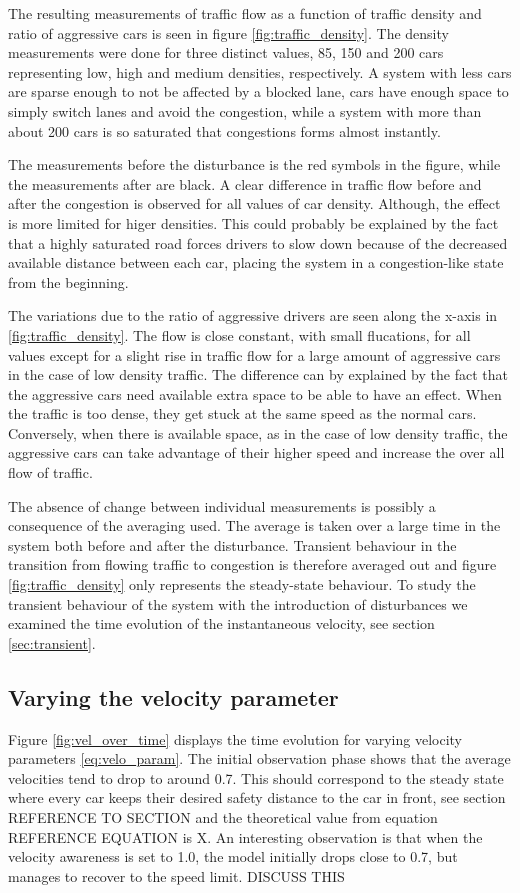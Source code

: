 \documentclass[11pt,a4paper,twocolumn]{article}
\begin{document}
 The resulting measurements of traffic flow as a function of traffic density and ratio of aggressive cars is seen in figure \ref{fig:traffic_density}. The density measurements were done for three distinct values, 85, 150 and 200 cars representing low, high and medium densities, respectively. A system with less cars are sparse enough to not be affected by a blocked lane, cars have enough space to simply switch lanes and avoid the congestion, while a system with more than about 200 cars is so saturated that congestions forms almost instantly.
 
 The measurements before the disturbance is the red symbols in the figure, while the measurements after are black. A clear difference in traffic flow before and after the congestion is observed for all values of car density. Although, the effect is more limited for higer densities. This could probably be explained by the fact that a highly saturated road forces drivers to slow down because of the decreased available distance between each car, placing the system in a congestion-like state from the beginning.

 The variations due to the ratio of aggressive drivers are seen along the x-axis in \ref{fig:traffic_density}. The flow is close constant, with small flucations, for all values except for a slight rise in traffic flow for a large amount of aggressive cars in the case of low density traffic. The difference can by explained by the fact that the aggressive cars need available extra space to be able to have an effect. When the traffic is too dense, they get stuck at the same speed as the normal cars. Conversely, when there is available space, as in the case of low density traffic, the aggressive cars can take advantage of their higher speed and increase the over all flow of traffic.  

 The absence of change between individual measurements is possibly a consequence of the averaging used. The average is taken over a large time in the system both before and after the disturbance. Transient behaviour in the transition from flowing traffic to congestion is therefore averaged out and figure \ref{fig:traffic_density} only represents the steady-state behaviour. To study the transient behaviour of the system with the introduction of disturbances we examined the time evolution of the instantaneous velocity, see section \ref{sec:transient}. 

\subsection{Varying the velocity parameter}
Figure \ref{fig:vel_over_time} displays the time evolution for varying velocity parameters \eqref{eq:velo_param}. The initial observation phase shows that the average velocities tend to drop to around 0.7.
This should correspond to the steady state where every car keeps their desired safety distance to the car in front, see section REFERENCE TO SECTION and the theoretical value from equation REFERENCE EQUATION is X.
An interesting observation is that when the velocity awareness is set to 1.0, the model initially drops close to 0.7, but manages to recover to the speed limit. DISCUSS THIS
\end{document}
